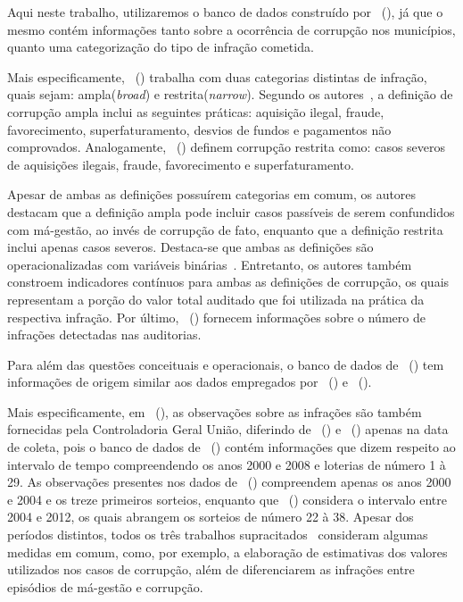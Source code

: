\documentclass[
	12pt,				%
	openright,			%
	twoside,			%
	a4paper,			%
	openany,
	english,			%
	brazil				%
	]{abntex2}
\begin{document}
Aqui neste trabalho, utilizaremos o banco de dados construído por ~(\citeyear{Brollo2013Aug}), já que o mesmo contém informações tanto sobre a ocorrência de corrupção nos municípios, quanto uma categorização do tipo de infração cometida.

Mais especificamente, ~(\citeyear{Brollo2013Aug}) trabalha com duas categorias distintas de infração, quais sejam: ampla(\textit{broad}) e restrita(\textit{narrow}). Segundo os autores~\cite{Brollo2013Aug}, a definição de corrupção ampla inclui as seguintes práticas: aquisição ilegal, fraude, favorecimento, superfaturamento, desvios de fundos e pagamentos não comprovados. Analogamente, ~(\citeyear{Brollo2013Aug}) definem corrupção restrita como: casos severos de aquisições ilegais, fraude, favorecimento e superfaturamento. 

Apesar de ambas as definições possuírem categorias em comum, os autores~\cite{Brollo2013Aug} destacam que a definição ampla pode incluir casos passíveis de serem confundidos com má-gestão, ao invés de corrupção de fato, enquanto que a definição restrita inclui apenas casos severos. Destaca-se que ambas as definições são operacionalizadas com variáveis binárias~\cite{Botero2021Apr}. Entretanto, os autores também constroem indicadores contínuos para ambas as definições de corrupção, os quais representam a porção do valor total auditado que foi utilizada na prática da respectiva infração. Por último, ~(\citeyear{Botero2021Apr}) fornecem informações sobre o número de infrações detectadas nas auditorias.

Para além das questões conceituais e operacionais, o banco de dados de ~(\citeyear{Brollo2013Aug}) tem informações de origem similar aos dados empregados por ~(\citeyear{ferraz2008exposing}) e ~(\citeyear{Avis2018Oct}).

Mais especificamente, em ~(\citeyear{Brollo2013Aug}), as observações sobre as infrações são também fornecidas pela Controladoria Geral União, diferindo de ~(\citeyear{ferraz2008exposing}) e ~(\citeyear{Avis2018Oct}) apenas na data de coleta, pois o banco de dados de ~(\citeyear{Brollo2013Aug}) contém informações que dizem respeito ao intervalo de tempo compreendendo os anos 2000 e 2008 e loterias de número 1 à 29. As observações presentes nos dados de ~(\citeyear{ferraz2008exposing}) compreendem apenas os anos 2000 e 2004 e os treze primeiros sorteios, enquanto que ~(\citeyear{Avis2018Oct}) considera o intervalo entre 2004 e 2012, os quais abrangem os sorteios de número 22 à 38. Apesar dos períodos distintos, todos os três trabalhos supracitados~\cite{Brollo2013Aug, ferraz2008exposing, Avis2018Oct} consideram algumas medidas em comum, como, por exemplo, a elaboração de estimativas dos valores utilizados nos casos de corrupção, além de diferenciarem as infrações entre episódios de má-gestão e corrupção.
\end{document}
